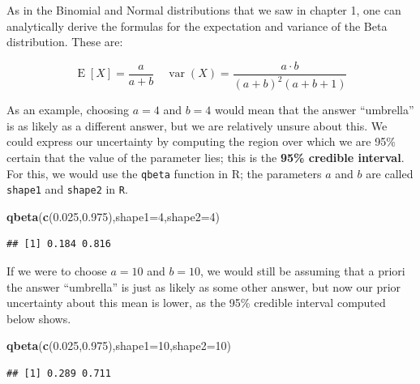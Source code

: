 \documentclass[12pt,]{krantz}
\newenvironment{Shaded}{\begin{snugshade}}{\end{snugshade}}
\newcommand{\DataTypeTok}[1]{\textcolor[rgb]{0.13,0.29,0.53}{#1}}
\newcommand{\DecValTok}[1]{\textcolor[rgb]{0.00,0.00,0.81}{#1}}
\newcommand{\FloatTok}[1]{\textcolor[rgb]{0.00,0.00,0.81}{#1}}
\newcommand{\KeywordTok}[1]{\textcolor[rgb]{0.13,0.29,0.53}{\textbf{#1}}}
\newcommand{\NormalTok}[1]{#1}
\theoremstyle{definition}
\theoremstyle{definition}
\theoremstyle{definition}
\theoremstyle{remark}
\begin{document}
As in the Binomial and Normal distributions that we saw in chapter 1, one can analytically derive the formulas for the expectation and variance of the Beta distribution. These are:

\begin{equation}
\operatorname{E}[X] = \frac{a}{a+b} \quad \operatorname{var}(X)=\frac {a \cdot b }{(a + b )^{2}(a + b +1)}
\label{eq:meanvar}
\end{equation}

As an example, choosing \(a=4\) and \(b=4\) would mean that the answer ``umbrella'' is as likely as a different answer, but we are relatively unsure about this. We could express our uncertainty by computing the region over which we are 95\% certain that the value of the parameter lies; this is the \textbf{95\% credible interval}. For this, we would use the \texttt{qbeta} function in R; the parameters \(a\) and \(b\) are called \texttt{shape1} and \texttt{shape2} in \texttt{R}.

\begin{Shaded}
\begin{Highlighting}[]
\KeywordTok{qbeta}\NormalTok{(}\KeywordTok{c}\NormalTok{(}\FloatTok{0.025}\NormalTok{,}\FloatTok{0.975}\NormalTok{),}\DataTypeTok{shape1=}\DecValTok{4}\NormalTok{,}\DataTypeTok{shape2=}\DecValTok{4}\NormalTok{)}
\end{Highlighting}
\end{Shaded}

\begin{verbatim}
## [1] 0.184 0.816
\end{verbatim}

If we were to choose \(a=10\) and \(b=10\), we would still be assuming that a priori the answer ``umbrella'' is just as likely as some other answer, but now our prior uncertainty about this mean is lower, as the 95\% credible interval computed below shows.

\begin{Shaded}
\begin{Highlighting}[]
\KeywordTok{qbeta}\NormalTok{(}\KeywordTok{c}\NormalTok{(}\FloatTok{0.025}\NormalTok{,}\FloatTok{0.975}\NormalTok{),}\DataTypeTok{shape1=}\DecValTok{10}\NormalTok{,}\DataTypeTok{shape2=}\DecValTok{10}\NormalTok{)}
\end{Highlighting}
\end{Shaded}

\begin{verbatim}
## [1] 0.289 0.711
\end{verbatim}
\end{document}
